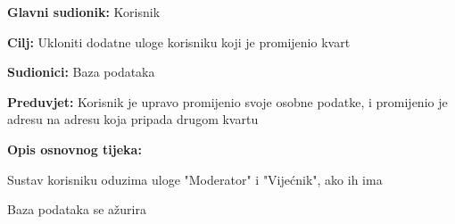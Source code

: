 					\noindent {}
					\begin{packed_item}
	
						\item \textbf{Glavni sudionik: }Korisnik
						\item  \textbf{Cilj:} Ukloniti dodatne uloge korisniku koji je promijenio kvart
						\item  \textbf{Sudionici:} Baza podataka
						\item  \textbf{Preduvjet:} Korisnik je upravo promijenio svoje osobne podatke, i promijenio je adresu na adresu koja pripada drugom kvartu
						\item  \textbf{Opis osnovnog tijeka:}
						
						\item[] \begin{packed_enum}
	
							\item Sustav korisniku oduzima uloge "Moderator" i "Vijećnik", ako ih ima
							\item Baza podataka se ažurira
						\end{packed_enum}
					\end{packed_item}

